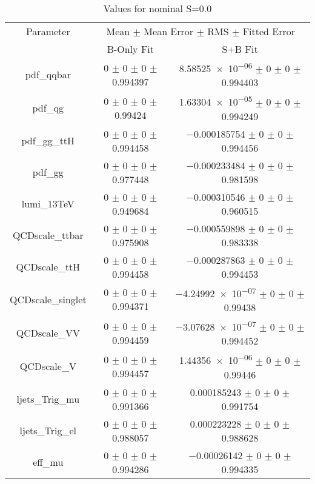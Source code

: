 \begin{table}
\centering
\caption{Values for nominal S=0.0}
\begin{tabular}{ccc}
\toprule
Parameter & \multicolumn{2}{c}{Mean $\pm$ Mean Error $\pm$ RMS $\pm$ Fitted Error}\\
 & B-Only Fit & S+B Fit\\
\midrule
pdf\_qqbar & \num{0} $\pm$ \num{0} $\pm$ \num{0} $\pm$ \num{0.994397} & \num{8.58525e-06} $\pm$ \num{0} $\pm$ \num{0} $\pm$ \num{0.994403}\\
pdf\_qg & \num{0} $\pm$ \num{0} $\pm$ \num{0} $\pm$ \num{0.99424} & \num{1.63304e-05} $\pm$ \num{0} $\pm$ \num{0} $\pm$ \num{0.994249}\\
pdf\_gg\_ttH & \num{0} $\pm$ \num{0} $\pm$ \num{0} $\pm$ \num{0.994458} & \num{-0.000185754} $\pm$ \num{0} $\pm$ \num{0} $\pm$ \num{0.994456}\\
pdf\_gg & \num{0} $\pm$ \num{0} $\pm$ \num{0} $\pm$ \num{0.977448} & \num{-0.000233484} $\pm$ \num{0} $\pm$ \num{0} $\pm$ \num{0.981598}\\
lumi\_13TeV & \num{0} $\pm$ \num{0} $\pm$ \num{0} $\pm$ \num{0.949684} & \num{-0.000310546} $\pm$ \num{0} $\pm$ \num{0} $\pm$ \num{0.960515}\\
QCDscale\_ttbar & \num{0} $\pm$ \num{0} $\pm$ \num{0} $\pm$ \num{0.975908} & \num{-0.000559898} $\pm$ \num{0} $\pm$ \num{0} $\pm$ \num{0.983338}\\
QCDscale\_ttH & \num{0} $\pm$ \num{0} $\pm$ \num{0} $\pm$ \num{0.994458} & \num{-0.000287863} $\pm$ \num{0} $\pm$ \num{0} $\pm$ \num{0.994453}\\
QCDscale\_singlet & \num{0} $\pm$ \num{0} $\pm$ \num{0} $\pm$ \num{0.994371} & \num{-4.24992e-07} $\pm$ \num{0} $\pm$ \num{0} $\pm$ \num{0.99438}\\
QCDscale\_VV & \num{0} $\pm$ \num{0} $\pm$ \num{0} $\pm$ \num{0.994459} & \num{-3.07628e-07} $\pm$ \num{0} $\pm$ \num{0} $\pm$ \num{0.994452}\\
QCDscale\_V & \num{0} $\pm$ \num{0} $\pm$ \num{0} $\pm$ \num{0.994457} & \num{1.44356e-06} $\pm$ \num{0} $\pm$ \num{0} $\pm$ \num{0.99446}\\
ljets\_Trig\_mu & \num{0} $\pm$ \num{0} $\pm$ \num{0} $\pm$ \num{0.991366} & \num{0.000185243} $\pm$ \num{0} $\pm$ \num{0} $\pm$ \num{0.991754}\\
ljets\_Trig\_el & \num{0} $\pm$ \num{0} $\pm$ \num{0} $\pm$ \num{0.988057} & \num{0.000223228} $\pm$ \num{0} $\pm$ \num{0} $\pm$ \num{0.988628}\\
eff\_mu & \num{0} $\pm$ \num{0} $\pm$ \num{0} $\pm$ \num{0.994286} & \num{-0.00026142} $\pm$ \num{0} $\pm$ \num{0} $\pm$ \num{0.994335}\\

\end{tabular}
\end{table}
